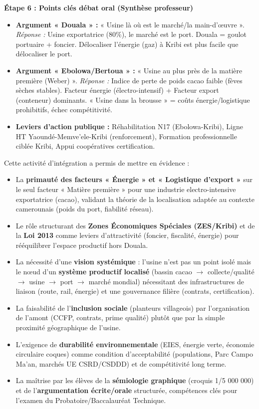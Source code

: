 \documentclass[11pt]{article}
\newcommand{\cle}[1]{{\popxbold\color{popdark}#1}}
\newcounter{popsec}
\newcounter{popsub}
\newcommand{\courssub}[1]{%
  \stepcounter{popsub}%
  \par\vspace{9pt}\noindent{\popxbold\fontsize{11.5}{13}\selectfont\color{popink}{\color{poporange}\thepopsec.\thepopsub}\hspace{6pt}#1}\par\nopagebreak\vspace{4pt}
}
\begin{document}
\begin{exoresolu}
\textbf{Étape 6 : Points clés débat oral (Synthèse professeur)}
\begin{itemize}
    \item \textbf{Argument « Douala » :} « Usine là où est le marché/la main-d'œuvre ». \textit{Réponse :} Usine exportatrice (80\%), le marché est le port. Douala = goulot portuaire + foncier. Délocaliser l'énergie (gaz) à Kribi est plus facile que délocaliser le port.
    \item \textbf{Argument « Ebolowa/Bertoua » :} « Usine au plus près de la matière première (Weber) ». \textit{Réponse :} Indice de perte de poids cacao faible (fèves sèches stables). Facteur énergie (électro-intensif) + Facteur export (conteneur) dominants. « Usine dans la brousse » = coûts énergie/logistique prohibitifs, échec compétitivité.
    \item \textbf{Leviers d'action publique :} Réhabilitation N17 (Ebolowa-Kribi), Ligne HT Yaoundé-Memve'ele-Kribi (renforcement), Formation professionnelle ciblée Kribi, Appui coopératives certification.
\end{itemize}
\end{exoresolu}

\courssub{Bilan de l'activité}
Cette activité d'intégration a permis de mettre en évidence :
\begin{itemize}
    \item La \textbf{primauté des facteurs « Énergie » et « Logistique d'export »} sur le seul facteur « Matière première » pour une industrie electro-intensive exportatrice (cacao), validant la théorie de la localisation adaptée au contexte camerounais (poids du port, fiabilité réseau).
    \item Le rôle structurant des \textbf{Zones Économiques Spéciales (ZES/Kribi)} et de la \textbf{Loi 2013} comme leviers d'attractivité (foncier, fiscalité, énergie) pour rééquilibrer l'espace productif hors Douala.
    \item La nécessité d'une \textbf{vision systémique} : l'usine n'est pas un point isolé mais le nœud d'un \textbf{système productif localisé} (bassin cacao $\rightarrow$ collecte/qualité $\rightarrow$ usine $\rightarrow$ port $\rightarrow$ marché mondial) nécessitant des infrastructures de liaison (route, rail, énergie) et une gouvernance filière (contrats, certification).
    \item La faisabilité de l'\textbf{inclusion sociale} (planteurs villageois) par l'organisation de l'amont (CCFP, contrats, prime qualité) plutôt que par la simple proximité géographique de l'usine.
    \item L'exigence de \textbf{durabilité environnementale} (EIES, énergie verte, économie circulaire coques) comme condition d'acceptabilité (populations, Parc Campo Ma'an, marchés UE \cle{CSRD}/\cle{CSDDD}) et de compétitivité long terme.
    \item La maîtrise par les élèves de la \textbf{sémiologie graphique} (croquis 1/5 000 000) et de l'\textbf{argumentation écrite/orale} structurée, compétences clés pour l'examen du \cle{Probatoire/Baccalauréat Technique}.
\end{itemize}
\end{document}
